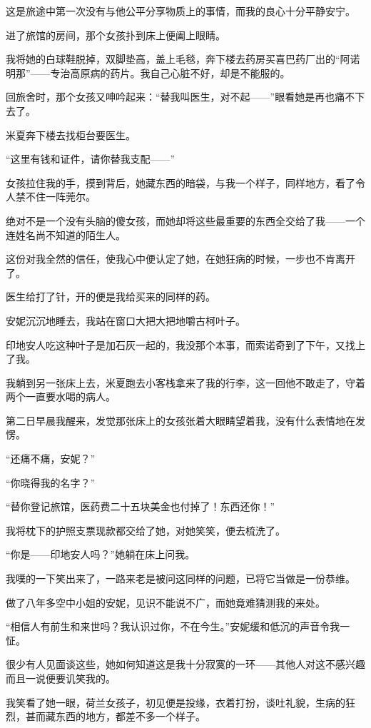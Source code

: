 \par 这是旅途中第一次没有与他公平分享物质上的事情，而我的良心十分平静安宁。
\par 进了旅馆的房间，那个女孩扑到床上便阖上眼睛。
\par 我将她的白球鞋脱掉，双脚垫高，盖上毛毯，奔下楼去药房买喜巴药厂出的“阿诺明那”——专治高原病的药片。我自己心脏不好，却是不能服的。
\par 回旅舍时，那个女孩又呻吟起来：“替我叫医生，对不起——”眼看她是再也痛不下去了。
\par 米夏奔下楼去找柜台要医生。
\par “这里有钱和证件，请你替我支配——”
\par 女孩拉住我的手，摸到背后，她藏东西的暗袋，与我一个样子，同样地方，看了令人禁不住一阵莞尔。
\par 绝对不是一个没有头脑的傻女孩，而她却将这些最重要的东西全交给了我——一个连姓名尚不知道的陌生人。
\par 这份对我全然的信任，使我心中便认定了她，在她狂病的时候，一步也不肯离开了。
\par 医生给打了针，开的便是我给买来的同样的药。
\par 安妮沉沉地睡去，我站在窗口大把大把地嚼古柯叶子。
\par 印地安人吃这种叶子是加石灰一起的，我没那个本事，而索诺奇到了下午，又找上了我。
\par 我躺到另一张床上去，米夏跑去小客栈拿来了我的行李，这一回他不敢走了，守着两个一直要水喝的病人。
\par 第二日早晨我醒来，发觉那张床上的女孩张着大眼睛望着我，没有什么表情地在发愣。
\par “还痛不痛，安妮？”
\par “你晓得我的名字？”
\par “替你登记旅馆，医药费二十五块美金也付掉了！东西还你！”
\par 我将枕下的护照支票现款都交给了她，对她笑笑，便去梳洗了。
\par “你是——印地安人吗？”她躺在床上问我。
\par 我噗的一下笑出来了，一路来老是被问这同样的问题，已将它当做是一份恭维。
\par 做了八年多空中小姐的安妮，见识不能说不广，而她竟难猜测我的来处。
\par “相信人有前生和来世吗？我认识过你，不在今生。”安妮缓和低沉的声音令我一怔。
\par 很少有人见面谈这些，她如何知道这是我十分寂寞的一环——其他人对这不感兴趣而且一说便要讥笑我的。
\par 我笑看了她一眼，荷兰女孩子，初见便是投缘，衣着打扮，谈吐礼貌，生病的狂烈，甚而藏东西的地方，都差不多一个样子。
